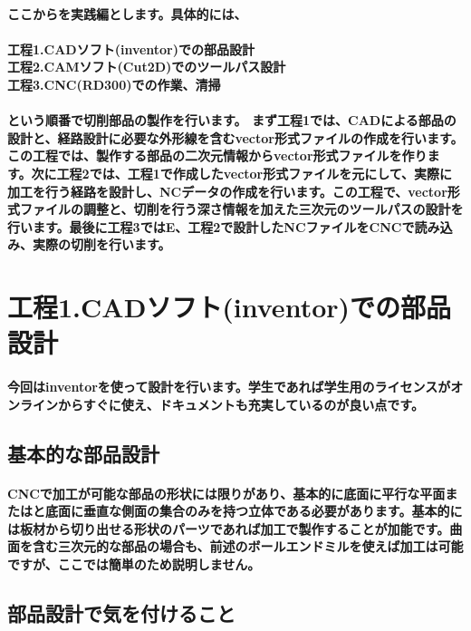 \documentclass[b5paper, 9pt, twocolumn, titlepage,openany]{jsbook}%
\begin{document}
\paragraph{ここからを実践編とします。具体的には、\\\\
工程1.CADソフト(inventor)での部品設計\\
工程2.CAMソフト(Cut2D)でのツールパス設計\\
工程3.CNC(RD300)での作業、清掃\\\\
という順番で切削部品の製作を行います。
まず工程1では、CADによる部品の設計と、経路設計に必要な外形線を含むvector形式ファイルの作成を行います。この工程では、製作する部品の二次元情報からvector形式ファイルを作ります。次に工程2では、工程1で作成したvector形式ファイルを元にして、実際に加工を行う経路を設計し、NCデータの作成を行います。この工程で、vector形式ファイルの調整と、切削を行う深さ情報を加えた三次元のツールパスの設計を行います。最後に工程3ではE、工程2で設計したNCファイルをCNCで読み込み、実際の切削を行います。}

\section{工程1.CADソフト(inventor)での部品設計}
\paragraph{今回はinventorを使って設計を行います。学生であれば学生用のライセンスがオンラインからすぐに使え、ドキュメントも充実しているのが良い点です。}

\subsection{基本的な部品設計}
\paragraph{CNCで加工が可能な部品の形状には限りがあり、基本的に底面に平行な平面またはと底面に垂直な側面の集合のみを持つ立体である必要があります。基本的には板材から切り出せる形状のパーツであれば加工で製作することが加能です。曲面を含む三次元的な部品の場合も、前述のボールエンドミルを使えば加工は可能ですが、ここでは簡単のため説明しません。}

\subsection{部品設計で気を付けること}
\end{document}
